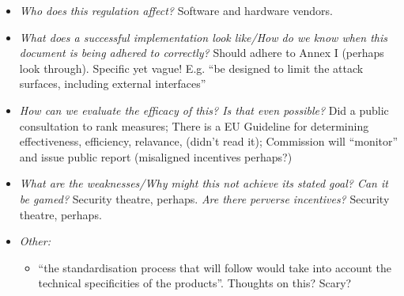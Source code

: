\documentclass[11pt]{article}
\begin{document}
\begin{itemize}
    \item {\it Who does this regulation affect?} Software and hardware vendors. 
    \item {\it What does a successful implementation look like/How do we know when this document is being adhered to correctly?} Should adhere to Annex I (perhaps look through). Specific yet vague! E.g. ``be designed to limit the attack surfaces, including external interfaces''
    \item {\it How can we evaluate the efficacy of this? Is that even possible?} Did a public consultation to rank measures; There is a EU Guideline for determining effectiveness, efficiency, relavance, (didn't read it); Commission will ``monitor'' and issue public report (misaligned incentives perhaps?)
    \item {\it What are the weaknesses/Why might this not achieve its stated goal? Can it be gamed?} Security theatre, perhaps. {\it Are there perverse incentives?} Security theatre, perhaps.
    \item {\it Other:}
    \begin{itemize}
        \item ``the standardisation process that will follow would take into account the technical specificities of the products''. Thoughts on this? Scary?
    \end{itemize}
\end{itemize}


\end{document}
